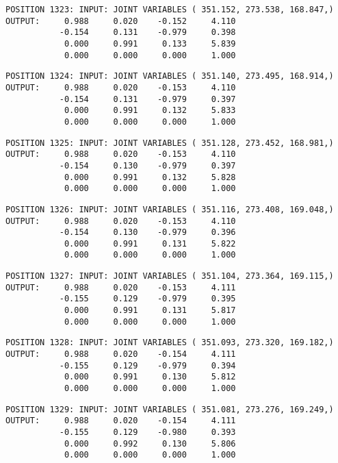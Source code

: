 \begin{verbatim}
POSITION 1323: INPUT: JOINT VARIABLES ( 351.152, 273.538, 168.847,)
OUTPUT:     0.988     0.020    -0.152     4.110
           -0.154     0.131    -0.979     0.398
            0.000     0.991     0.133     5.839
            0.000     0.000     0.000     1.000
\end{verbatim} \pagebreak[1]\begin{verbatim}
POSITION 1324: INPUT: JOINT VARIABLES ( 351.140, 273.495, 168.914,)
OUTPUT:     0.988     0.020    -0.153     4.110
           -0.154     0.131    -0.979     0.397
            0.000     0.991     0.132     5.833
            0.000     0.000     0.000     1.000
\end{verbatim} \pagebreak[1]\begin{verbatim}
POSITION 1325: INPUT: JOINT VARIABLES ( 351.128, 273.452, 168.981,)
OUTPUT:     0.988     0.020    -0.153     4.110
           -0.154     0.130    -0.979     0.397
            0.000     0.991     0.132     5.828
            0.000     0.000     0.000     1.000
\end{verbatim} \pagebreak[1]\begin{verbatim}
POSITION 1326: INPUT: JOINT VARIABLES ( 351.116, 273.408, 169.048,)
OUTPUT:     0.988     0.020    -0.153     4.110
           -0.154     0.130    -0.979     0.396
            0.000     0.991     0.131     5.822
            0.000     0.000     0.000     1.000
\end{verbatim} \pagebreak[1]\begin{verbatim}
POSITION 1327: INPUT: JOINT VARIABLES ( 351.104, 273.364, 169.115,)
OUTPUT:     0.988     0.020    -0.153     4.111
           -0.155     0.129    -0.979     0.395
            0.000     0.991     0.131     5.817
            0.000     0.000     0.000     1.000
\end{verbatim} \pagebreak[1]\begin{verbatim}
POSITION 1328: INPUT: JOINT VARIABLES ( 351.093, 273.320, 169.182,)
OUTPUT:     0.988     0.020    -0.154     4.111
           -0.155     0.129    -0.979     0.394
            0.000     0.991     0.130     5.812
            0.000     0.000     0.000     1.000
\end{verbatim} \pagebreak[1]\begin{verbatim}
POSITION 1329: INPUT: JOINT VARIABLES ( 351.081, 273.276, 169.249,)
OUTPUT:     0.988     0.020    -0.154     4.111
           -0.155     0.129    -0.980     0.393
            0.000     0.992     0.130     5.806
            0.000     0.000     0.000     1.000
\end{verbatim} \pagebreak[1]\begin{verbatim}

\end{verbatim}
